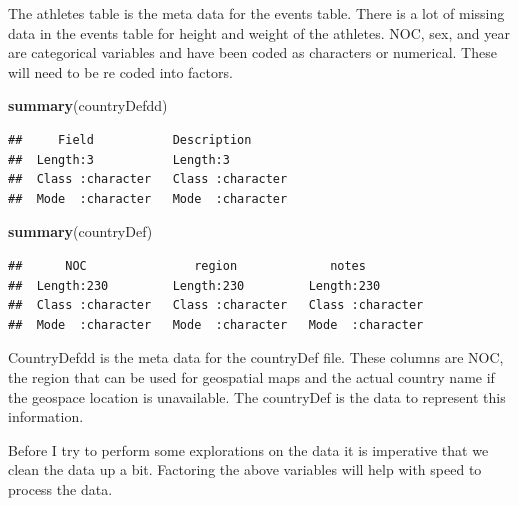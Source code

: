 \documentclass[
]{article}
\newenvironment{Shaded}{\begin{snugshade}}{\end{snugshade}}
\newcommand{\AttributeTok}[1]{\textcolor[rgb]{0.13,0.29,0.53}{#1}}
\newcommand{\CommentTok}[1]{\textcolor[rgb]{0.56,0.35,0.01}{\textit{#1}}}
\newcommand{\FunctionTok}[1]{\textcolor[rgb]{0.13,0.29,0.53}{\textbf{#1}}}
\newcommand{\NormalTok}[1]{#1}
\newcommand{\OtherTok}[1]{\textcolor[rgb]{0.56,0.35,0.01}{#1}}
\newcommand{\SpecialCharTok}[1]{\textcolor[rgb]{0.81,0.36,0.00}{\textbf{#1}}}
\newcommand{\StringTok}[1]{\textcolor[rgb]{0.31,0.60,0.02}{#1}}
\begin{document}
The athletes table is the meta data for the events table. There is a lot of missing data in the events table for height and weight of the athletes. NOC, sex, and year are categorical variables and have been coded as characters or numerical. These will need to be re coded into factors.

\begin{Shaded}
\begin{Highlighting}[]
\FunctionTok{summary}\NormalTok{(countryDefdd)}
\end{Highlighting}
\end{Shaded}

\begin{verbatim}
##     Field           Description       
##  Length:3           Length:3          
##  Class :character   Class :character  
##  Mode  :character   Mode  :character
\end{verbatim}

\begin{Shaded}
\begin{Highlighting}[]
\FunctionTok{summary}\NormalTok{(countryDef)}
\end{Highlighting}
\end{Shaded}

\begin{verbatim}
##      NOC               region             notes          
##  Length:230         Length:230         Length:230        
##  Class :character   Class :character   Class :character  
##  Mode  :character   Mode  :character   Mode  :character
\end{verbatim}

CountryDefdd is the meta data for the countryDef file. These columns are NOC, the region that can be used for geospatial maps and the actual country name if the geospace location is unavailable. The countryDef is the data to represent this information.

Before I try to perform some explorations on the data it is imperative that we clean the data up a bit. Factoring the above variables will help with speed to process the data.

\begin{Shaded}
\end{Shaded}
\end{document}

